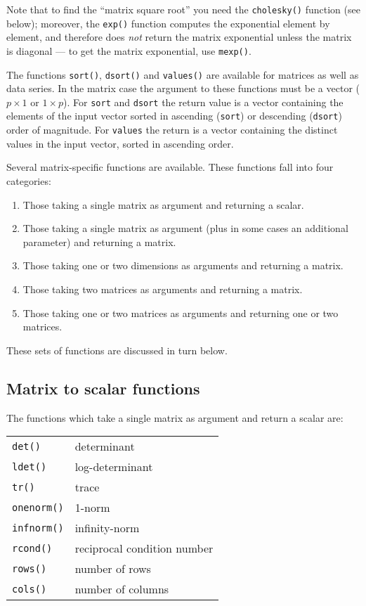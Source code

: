 Note that to find the ``matrix square root'' you need the
\texttt{cholesky()} function (see below); moreover, the \texttt{exp()}
function computes the exponential element by element, and therefore
does \emph{not} return the matrix exponential unless the matrix is
diagonal --- to get the matrix exponential, use \texttt{mexp()}.
  
The functions \texttt{sort()}, \texttt{dsort()} and \texttt{values()}
are available for matrices as well as data series.  In the matrix case
the argument to these functions must be a vector ($p \times 1$ or
$1\times p$).  For \texttt{sort} and \texttt{dsort} the return value
is a vector containing the elements of the input vector sorted in
ascending (\texttt{sort}) or descending (\texttt{dsort}) order of
magnitude.  For \texttt{values} the return is a vector containing the
distinct values in the input vector, sorted in ascending order.

Several matrix-specific functions are available.  These functions fall
into four categories:
%
\begin{enumerate}
\item Those taking a single matrix as argument and returning a scalar.
\item Those taking a single matrix as argument (plus in some cases an
  additional parameter) and returning a matrix.
\item Those taking one or two dimensions as arguments and
  returning a matrix.
\item Those taking two matrices as arguments and returning a matrix.
\item Those taking one or two matrices as arguments and returning one
  or two matrices.
\end{enumerate}
%
These sets of functions are discussed in turn below.

\subsection{Matrix to scalar functions}
\label{matrix-to-scalar}

The functions which take a single matrix as argument and return a
scalar are:

\begin{center}
\begin{tabular}{ll}
\texttt{det()} & determinant \\
\texttt{ldet()} & log-determinant \\
\texttt{tr()} & trace \\
\texttt{onenorm()} & 1-norm \\
\texttt{infnorm()} & infinity-norm \\
\texttt{rcond()} & reciprocal condition number \\
\texttt{rows()} & number of rows \\
\texttt{cols()} & number of columns 
\end{tabular}
\end{center}

